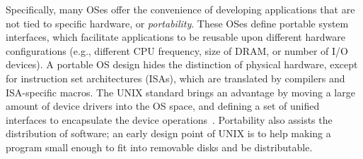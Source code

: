 Specifically, many OSes offer the convenience of developing applications
that are not tied to specific hardware, or {\em portability}.
These OSes define portable system interfaces,
which facilitate applications to be reusable upon
different hardware configurations
(e.g., different CPU frequency, size of DRAM, or number of I/O devices).
A portable OS design hides the distinction of physical hardware,
except for instruction set architectures (ISAs), which are translated by compilers and ISA-specific macros.
The UNIX standard brings an advantage by
moving a large amount of device drivers
into the OS space, and defining a set of unified interfaces to encapsulate the device operations~\cite{ritchie74unix}.
Portability also assists the distribution of software;
an early design point of UNIX is to help making a program small enough to fit into
removable disks and be distributable.
